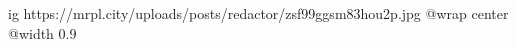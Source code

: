  
 
 
 
 

\ifcmt
  ig https://mrpl.city/uploads/posts/redactor/zsf99ggsm83hou2p.jpg
  @wrap center
  @width 0.9
\fi
